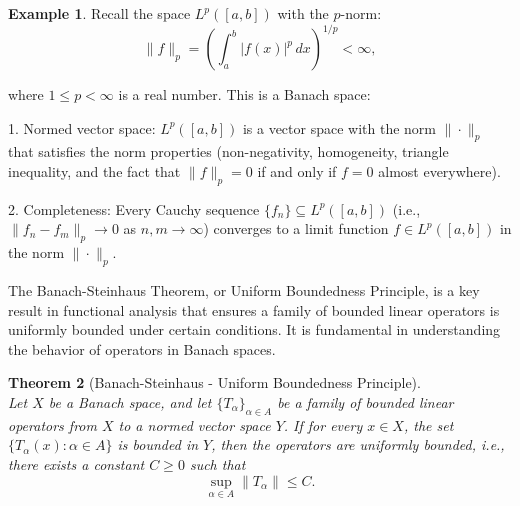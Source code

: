 \documentclass[12pt, reqno]{amsart}
\newtheorem{theorem}{Theorem}[section]
\theoremstyle{definition}
\newtheorem{example}[theorem]{Example}
\numberwithin{equation}{section}
\begin{document}
\begin{comment}
    
\begin{example}
Let $C([a, b])$ denote the space of continuous real-valued functions on the interval $[a, b]$. For $f \in C([a, b])$, the $supremum norm$ is defined as:

$
\|f\|_\infty = \sup_{x \in [a,b]} |f(x)|
$

The space $C([a, b])$, equipped with the supremum norm $\|\cdot\|_\infty$, is a Banach space. This means that any Cauchy sequence of functions in $C([a, b])$ converges uniformly to a function that is also in $C([a, b])$.
\end{example}

The following example is more advanced. It involves measurable functions and the concept of integrability, while the previous example only deals with continuous functions. 

\end{comment}
\begin{example}
    Recall the space $L^p([a, b])$ with the $p$-norm:
\[
\|f\|_p = \left( \int_a^b |f(x)|^p \, dx \right)^{1/p} < \infty,
\]

where $1 \leq p < \infty$ is a real number. This is a Banach space:

1. Normed vector space: $L^p([a, b])$ is a vector space with the norm $\|\cdot\|_p$ that satisfies the norm properties (non-negativity, homogeneity, triangle inequality, and the fact that $\|f\|_p = 0$ if and only if $f = 0$ almost everywhere).

2. Completeness: Every Cauchy sequence $\{f_n\} \subseteq L^p([a, b])$ (i.e., $\|f_n - f_m\|_p \to 0$ as $n, m \to \infty$) converges to a limit function $f \in L^p([a, b])$ in the norm $\|\cdot\|_p$.

\end{example}

The Banach-Steinhaus Theorem, or Uniform Boundedness Principle, is a key result in functional analysis that ensures a family of bounded linear operators is uniformly bounded under certain conditions. It is fundamental in understanding the behavior of operators in Banach spaces.

\begin{theorem} [Banach-Steinhaus - Uniform Boundedness Principle] \hfill \\
Let $X$ be a Banach space, and let $\{T_\alpha\}_{\alpha \in A}$ be a family of bounded linear operators from $X$ to a normed vector space $Y$. If for every $x \in X$, the set $\{T_\alpha(x) : \alpha \in A\}$ is bounded in $Y$, then the operators are uniformly bounded, i.e., there exists a constant $C \geq 0$ such that 
$$\sup_{\alpha \in A} \|T_\alpha\| \leq C.$$
\end{theorem}
\end{document}
